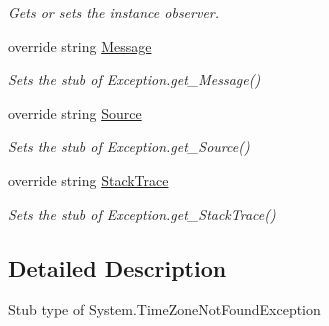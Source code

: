 \begin{DoxyCompactItemize}
\begin{DoxyCompactList}\small\item\em Gets or sets the instance observer.\end{DoxyCompactList}\item 
override string \hyperlink{class_system_1_1_fakes_1_1_stub_time_zone_not_found_exception_acef10623ab334aa3908206d9bdd5ad8d}{Message}
\begin{DoxyCompactList}\small\item\em Sets the stub of Exception.\-get\-\_\-\-Message()\end{DoxyCompactList}\item 
override string \hyperlink{class_system_1_1_fakes_1_1_stub_time_zone_not_found_exception_a6133b1edafae694abec6b0a0ce797f22}{Source}
\begin{DoxyCompactList}\small\item\em Sets the stub of Exception.\-get\-\_\-\-Source()\end{DoxyCompactList}\item 
override string \hyperlink{class_system_1_1_fakes_1_1_stub_time_zone_not_found_exception_ae5568ac2ae442475d7978595645c9530}{Stack\-Trace}
\begin{DoxyCompactList}\small\item\em Sets the stub of Exception.\-get\-\_\-\-Stack\-Trace()\end{DoxyCompactList}\end{DoxyCompactItemize}


\subsection{Detailed Description}
Stub type of System.\-Time\-Zone\-Not\-Found\-Exception




